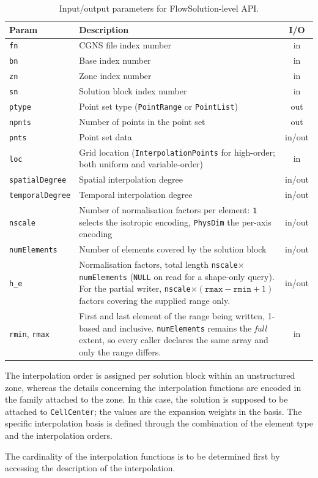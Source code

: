 \documentclass[11pt,letterpaper]{article}
\newenvironment{v2quote}
  {\begin{v2quoteframe}%
   \noindent{\footnotesize\sffamily\bfseries\color{cgnsblue}v2 text}%
   \nopagebreak\par\nopagebreak\vspace{0.15em}}
  {\end{v2quoteframe}}
\newif\ifvfourdraft
\newcommand{\vfour}[1]{\ifvfourdraft\textcolor{v4violet}{#1}\else#1\fi}
\begin{document}
\begin{table}[htbp]
\centering
\small
{}
\begin{tabular}{@{} l p{} c @{}}
\toprule
\textbf{Param} & \textbf{Description} & \textbf{I/O} \\
\midrule
\texttt{fn}   & CGNS file index number & in \\
\texttt{bn}   & Base index number & in \\
\texttt{zn}   & Zone index number & in \\
\texttt{sn}   & Solution block index number & in \\
\texttt{ptype}& Point set type (\texttt{PointRange} or \texttt{PointList}) & out \\
\texttt{npnts}& Number of points in the point set & out \\
\texttt{pnts} & Point set data & in/out \\
\texttt{loc}  & Grid location (\texttt{InterpolationPoints} for high-order; both uniform and variable-order) & in \\
\texttt{spatialDegree}  & Spatial interpolation degree & in/out \\
\texttt{temporalDegree} & Temporal interpolation degree & in/out \\
\texttt{nscale} & Number of normalisation factors per element: \texttt{1} selects the
  isotropic encoding, \texttt{PhysDim} the per-axis encoding & in/out \\
\texttt{numElements} & Number of elements covered by the solution block & in/out \\
\texttt{h\_e} & Normalisation factors, total length \texttt{nscale}$\times$\texttt{numElements}
  (\texttt{NULL} on read for a shape-only query).  \vfour{For the partial writer,
  \texttt{nscale}$\times(\texttt{rmax}-\texttt{rmin}+1)$ factors covering the
  supplied range only.} & in/out \\
\vfour{\texttt{rmin}, \texttt{rmax}} & \vfour{First and last element of the range
  being written, 1-based and inclusive.  \texttt{numElements} remains the
  \emph{full} extent, so every caller declares the same array and only the range
  differs.} & \vfour{in} \\
\bottomrule
\end{tabular}
\caption{Input/output parameters for FlowSolution-level API.}
\end{table}

\begin{v2quote}
The interpolation order is assigned per solution block within an unstructured zone, whereas the
details concerning the interpolation functions are encoded in the family attached to the zone.
In this case, the solution is supposed to be attached to \texttt{CellCenter}; the values are
the expansion weights in the basis.  The specific interpolation basis is defined through the
combination of the element type and the interpolation orders.

The cardinality of the interpolation functions is to be determined first by accessing the
description of the interpolation.
\end{v2quote}
\end{document}
